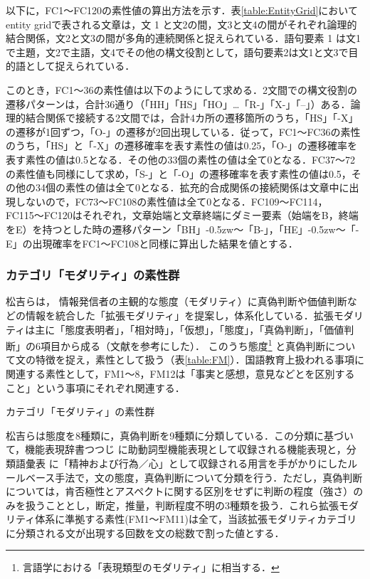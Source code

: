 \documentclass[japanese]{jnlp_1.5}
\newenvironment{iindent1zw}{}{}
\begin{document}
\begin{iindent1zw}
以下に，FC1〜FC120の素性値の算出方法を示す．表\ref{table:EntityGrid}においてentity gridで表される文章は，文 1 と文2の間，文3と文4の間がそれぞれ論理的結合関係，文2と文3の間が多角的連続関係と捉えられている．語句要素 1 は文1で主題，文2で主語，文4でその他の構文役割として，語句要素2は文1と文3で目的語として捉えられている．

このとき，FC1〜36の素性値は以下のようにして求める．2文間での構文役割の遷移パターンは，合計36通り（「HH」「HS」「HO」…「R-」「X-」「--」）ある．論理的結合関係で接続する2文間では，合計4カ所の遷移箇所のうち，「HS」「-X」の遷移が1回ずつ，「O-」の遷移が2回出現している．従って，FC1〜FC36の素性のうち，「HS」と「-X」の遷移確率を表す素性の値は0.25，「O-」の遷移確率を表す素性の値は0.5となる．その他の33個の素性の値は全て0となる．FC37〜72の素性値も同様にして求め，「S-」と「-O」の遷移確率を表す素性の値は0.5，その他の34個の素性の値は全て0となる．拡充的合成関係の接続関係は文章中に出現しないので，FC73〜FC108の素性値は全て0となる．FC109〜FC114，FC115〜FC120はそれぞれ，文章始端と文章終端にダミー要素（始端をB，終端をE）を持つとした時の遷移パターン「BH」{\kern-0.5zw}〜{\inhibitglue}「B-」，「HE」{\kern-0.5zw}〜{\inhibitglue}「-E」の出現確率をFC1〜FC108と同様に算出した結果を値とする．
\end{iindent1zw}


\subsubsection{カテゴリ「モダリティ」の素性群}

松吉ら\cite{MatsuyoshiEtAl2010}は，
情報発信者の主観的な態度（モダリティ）に真偽判断や価値判断などの情報を統合した「拡張モダリティ」を提案し，体系化している．拡張モダリティは主に「態度表明者」，「相対時」，「仮想」，「態度」，「真偽判断」，「価値判断」の6項目から成る（文献\cite{MatsuyoshiEtAl2011}を参考にした）．
このうち態度\footnote{
	言語学における「表現類型のモダリティ」\cite{Masuoka1991}に相当する．}
と真偽判断について文の特徴を捉え，素性として扱う（表\ref{table:FM}）．国語教育上扱われる事項に関連する素性として，FM1〜8，FM12は「事実と感想，意見などとを区別すること」\cite{MonbuKagakuSho2008}という事項にそれぞれ関連する．

\begin{table}[b]
\caption{カテゴリ「モダリティ」の素性群}
\label{table:FM}

\end{table}

松吉らは態度を8種類に，真偽判断を9種類に分類している．この分類に基づいて，機能表現辞書つつじ
\cite{MatsuyoshiEtAl2007}
に助動詞型機能表現として収録される機能表現と，分類語彙表
\cite{KokuritsuKokugoKenkyujo2004}
に「精神および行為／心」として収録される用言を手がかりにしたルールベース手法で，文の態度，真偽判断について分類を行う．ただし，真偽判断については，肯否極性とアスペクトに関する区別をせずに判断の程度（強さ）のみを扱うこととし，断定，推量，判断程度不明の3種類を扱う．これら拡張モダリティ体系に準拠する素性(FM1〜FM11)は全て，当該拡張モダリティカテゴリに分類される文が出現する回数を文の総数で割った値とする．
\end{document}
